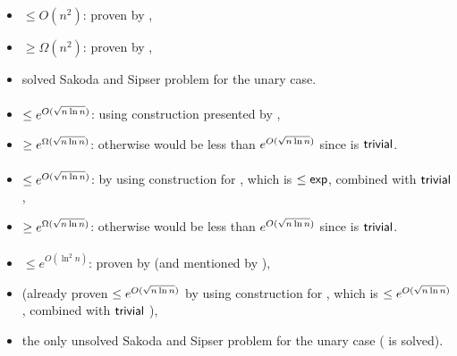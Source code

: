\paragraph{\ONFA{}\tto\TDFA}\label{cost:1NFAto2DFAu}
\begin{itemize}
	\item $\le O(n^2)$: proven by ,
	\item $\ge \Omega(n^2)$: proven by ,
	\item solved Sakoda and Sipser problem for the unary case.
\end{itemize}
\paragraph{\TNFA{}\tto\ODFA}\label{cost:2NFAto1DFAu}
\begin{itemize}
	\item $\le e^{O(\sqrt{n\ln n})}$: using construction presented by ,
	\item $\ge e^{\Omega(\sqrt{n\ln n})}$: otherwise \hyperref[cost:2DFAto1DFAu]{\TDFA{}\tto\ODFA} would be less than $e^{O(\sqrt{n\ln n})}$ since \TDFA{}\tto\TNFA is $\mathsf{trivial}$.
\end{itemize}
\paragraph{\TNFA{}\tto\ONFA}
\begin{itemize}
	\item $\le e^{O(\sqrt{n\ln n})}$: by using construction for \hyperref[cost:2NFAto1DFAu]{\TNFA{}\tto\ODFA}, which is $\le\mathsf{exp}$, combined with $\mathsf{trivial}$ \ODFA{}\tto\ONFA,
	\item $\ge e^{\Omega(\sqrt{n\ln n})}$: otherwise \hyperref[cost:2DFAto1NFAu]{\TDFA{}\tto\ONFA} would be less than $e^{O(\sqrt{n\ln n})}$ since \TDFA{}\tto\TNFA is $\mathsf{trivial}$.
\end{itemize}
\paragraph{\TNFA{}\tto\TDFA}\label{cost:2NFAto2DFAu}
\begin{itemize}
	\item $\le e^{O(\ln^2n)}$: proven by  (and mentioned by ),
	\item (already proven $\le e^{O(\sqrt{n\ln n})}$ by using construction for \hyperref[cost:2NFAto1DFAu]{\TNFA{}\tto\ODFA}, which is $\le e^{O(\sqrt{n\ln n})}$, combined with $\mathsf{trivial}$ \ODFA{}\tto\TDFA),
	\item the only unsolved Sakoda and Sipser problem for the unary case (\hyperref[cost:1NFAto2DFAu]{\ONFA{}\tto\TDFA} is solved).
\end{itemize}


